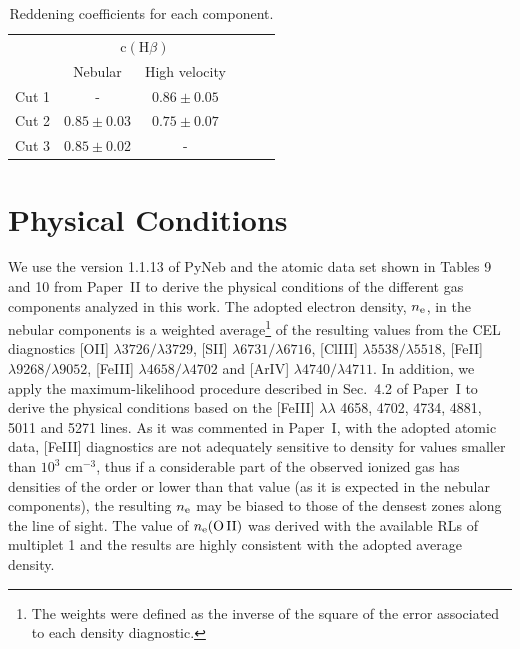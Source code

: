 \documentclass[fleqn,usenatbib]{mnras}
\begin{document}
\begin{table}
\caption{Reddening coefficients for each component.}
\label{tab:c_extin}
\begin{tabular}{lccccc}
\hline
 & \multicolumn{2}{c}{$\text{c}(\text{H}\beta)$} \\
  & Nebular & High velocity\\
\hline
Cut 1 & - & $0.86 \pm  0.05$  \\
Cut 2 & $0.85 \pm 0.03$ &$0.75 \pm 0.07$\\
Cut 3 & $0.85 \pm 0.02$&-\\
\hline
\end{tabular}
\end{table}





\section{Physical Conditions}
\label{sec:physical_cond}

We use the version 1.1.13 of PyNeb \citep{Luridiana15} and the atomic data set shown in Tables 9 and 10 from Paper~II to derive the physical conditions of the different gas  components analyzed in this work. The adopted electron density, $n_{\rm e}$, in the nebular components is a weighted average\footnote{The weights were defined as the inverse of the square of the error associated to each density diagnostic.} of the resulting values from the CEL diagnostics
[O\thinspace II] $\lambda3726/\lambda3729$, [S\thinspace II] $\lambda6731/\lambda6716$, [Cl\thinspace III] $\lambda5538/\lambda5518$, [Fe\thinspace II] $\lambda9268/\lambda9052$, [Fe\thinspace III] $\lambda4658/\lambda4702$ and [Ar\thinspace IV]  $\lambda4740/\lambda4711$.  In addition, we apply the maximum-likelihood procedure described in Sec.~4.2 of Paper~I to derive the physical conditions based on the [Fe\thinspace III] $\lambda \lambda $ 4658, 4702, 4734, 4881, 5011 and 5271 lines. As it was commented in Paper~I, with the adopted atomic data, [Fe\thinspace III] diagnostics are not adequately sensitive to density for values smaller than $10^{3} \text{ cm}^{-3}$, thus if a considerable part of the observed ionized gas has densities of the order or lower than that value (as it is expected in the nebular components), the resulting $n_{\rm e}$ may be biased to those of the densest zones along the line of sight. The value of $n_{\rm e}(\text{O\thinspace II})$ was derived with the available RLs of multiplet 1 and the results are highly consistent with the adopted average density.
\end{document}

